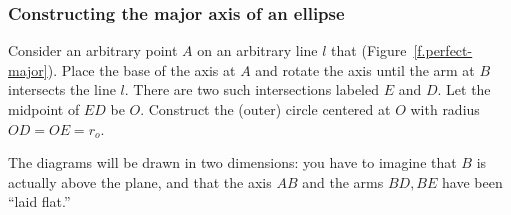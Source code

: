
\subsubsection*{Constructing the major axis of an ellipse}

Consider an arbitrary point $A$ on an arbitrary line $l$ that (Figure~\ref{f.perfect-major}). Place the base of the axis at $A$ and rotate the axis until the arm at $B$ intersects the line $l$. There are two such intersections labeled $E$ and $D$. Let the midpoint of $ED$ be $O$. Construct the (outer) circle centered at $O$ with radius $OD=OE=r_o$.

The diagrams will be drawn in two dimensions: you have to imagine that $B$ is actually above the plane, and that the axis $AB$ and the arms $BD, BE$ have been ``laid flat.''


